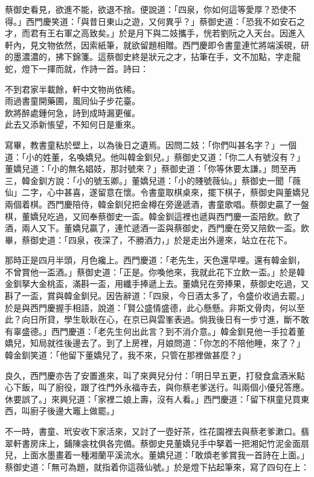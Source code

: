 蔡御史看見，欲進不能，欲退不捨。便說道：「四泉，你如何這等愛厚？恐使不得。」西門慶笑道：「與昔日東山之遊，又何異乎？」蔡御史道：「恐我不如安石之才，而君有王右軍之高致矣。」於是月下與二妓攜手，恍若劉阮之入天台。因進入軒內，見文物依然，因索紙筆，就欲留題相贈。西門慶即令書童連忙將端溪硯，研的墨濃濃的，拂下錦箋。這蔡御史終是狀元之才，拈筆在手，文不加點，字走龍蛇，燈下一揮而就，作詩一首。詩曰：

\begin{myquote} 
不到君家半載餘，軒中文物尚依稀。\\雨過書童開藥圃，風囘仙子步花臺。\\飲將醉處鍾何急，詩到成時漏更催。\\此去又添新悵望，不知何日是重來。
\end{myquote} 

寫畢，教書童粘於壁上，以為後日之遺焉。因問二妓：「你們叫甚名字？」一個道：「小的姓董，名喚嬌兒。他叫韓金釧兒。」蔡御史又道：「你二人有號沒有？」董嬌兒道：「小的無名娼妓，那討號來？」蔡御史道：「你等休要太謙。」問至再三，韓金釧方說：「小的號玉卿。」董嬌兒道：「小的賤號薇仙。」{}蔡御史一聞「薇仙」二字，心中甚喜，遂留意在懷。令書童取棋桌來，擺下棋子，蔡御史與董嬌兒兩個着棋。西門慶陪侍，韓金釧兒把金樽在旁邊遞酒，書童歌唱。蔡御史贏了一盤棋，董嬌兒吃過，又囘奉蔡御史一盃。韓金釧這裡也遞與西門慶一盃陪飲。飲了酒，兩人又下。董嬌兒贏了，連忙遞酒一盃與蔡御史，西門慶在旁又陪飲一盃。飲畢，蔡御史道：「四泉，夜深了，不勝酒力，」於是走出外邊來，站立在花下。

那時正是四月半頭，月色纔上。西門慶道：「老先生，天色還早哩。還有韓金釧，不曾賞他一盃酒。」蔡御史道：「正是。你喚他來，我就此花下立飲一盃。」於是韓金釧拏大金桃盃，滿斟一盃，用纖手捧遞上去。董嬌兒在旁捧果，蔡御史吃過，又斟了一盃，賞與韓金釧兒。因告辭道：「四泉，今日酒太多了，令盛价收過去罷。」於是與西門慶握手相語，說道：「賢公盛情盛德，此心懸懸。非斯文骨肉，何以至此？向日所貸，學生耿耿在心，在京已與雲峯表過。倘我後日有一步寸進，斷不敢有辜盛德。」西門慶道：「老先生何出此言？到不消介意。」韓金釧見他一手拉着董嬌兒，知局就徃後邊去了。到了上房裡，月娘問道：「你怎的不陪他睡，來了？」韓金釧笑道：「他留下董嬌兒了，我不來，只管在那裡做甚麼？」

良久，西門慶亦告了安置進來，叫了來興兒分付：「明日早五更，打發食盒酒米點心下飯，叫了廚役，跟了徃門外永福寺去，與你蔡老爹送行。叫兩個小優兒答應。休要誤了。」來興兒道：「家裡二娘上壽，沒有人看。」西門慶道：「留下棋童兒買東西，叫廚子後邊大竈上做罷。」

不一時，書童、玳安收下家活來，又討了一壺好茶，徃花園裡去與蔡老爹漱口。翡翠軒書房床上，鋪陳衾枕俱各完備。蔡御史見董嬌兒手中拏着一把湘妃竹泥金面扇兒，上面水墨畫着一種湘蘭平溪流水。董嬌兒道：「敢煩老爹賞我一首詩在上面。」蔡御史道：「無可為題，就指着你這薇仙號。」於是燈下拈起筆來，寫了四句在上：

